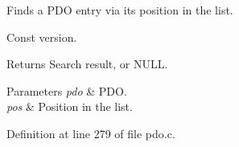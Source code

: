 Finds a P\-D\-O entry via its position in the list. 

Const version.

\begin{DoxyReturn}{Returns}
Search result, or N\-U\-L\-L. 
\end{DoxyReturn}

\begin{DoxyParams}{Parameters}
{\em pdo} & P\-D\-O. \\
\hline
{\em pos} & Position in the list. \\
\hline
\end{DoxyParams}


Definition at line 279 of file pdo.\-c.

